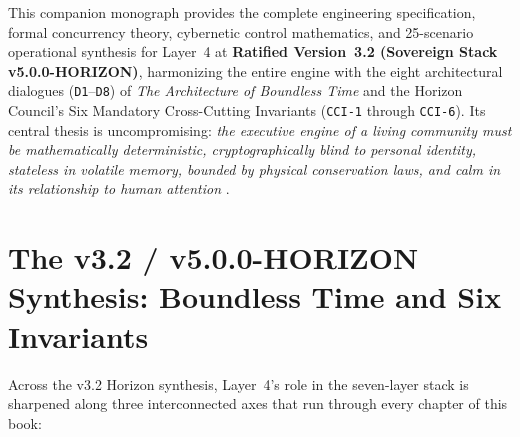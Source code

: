 This companion monograph provides the complete engineering specification, formal concurrency
theory, cybernetic control mathematics, and 25-scenario operational synthesis for Layer~4 at
\textbf{Ratified Version~3.2 (Sovereign Stack v5.0.0-HORIZON)}, harmonizing the entire engine
with the eight architectural dialogues (\texttt{D1}--\texttt{D8}) of \textit{The Architecture
of Boundless Time} and the Horizon Council's Six Mandatory Cross-Cutting Invariants
(\texttt{CCI-1} through \texttt{CCI-6}). Its central thesis is uncompromising: \textit{the
executive engine of a living community must be mathematically deterministic, cryptographically
blind to personal identity, stateless in volatile memory, bounded by physical conservation
laws, and calm in its relationship to human attention} \parencite{weiser1996calm,illich1973}.

\section*{The v3.2 / v5.0.0-HORIZON Synthesis: Boundless Time and Six Invariants}

Across the v3.2 Horizon synthesis, Layer~4's role in the seven-layer stack is sharpened along
three interconnected axes that run through every chapter of this book:

